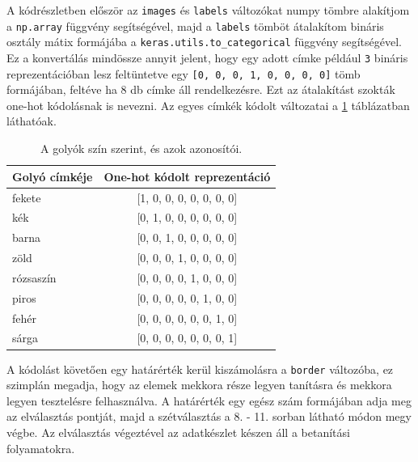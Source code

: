 \par A kódrészletben először az \lstinline{images} és \lstinline{labels} változókat numpy tömbre alakítjom a \lstinline{np.array} függvény segítségével, majd a \lstinline{labels} tömböt átalakítom bináris osztály mátix formájába a \lstinline{keras.utils.to_categorical} függvény\cite{tensorflow_docs} segítségével. Ez a konvertálás mindössze annyit jelent, hogy egy adott címke például \lstinline{3} bináris reprezentációban lesz feltüntetve egy \lstinline{[0, 0, 0, 1, 0, 0, 0, 0]} tömb formájában, feltéve ha 8 db címke áll rendelkezésre. Ezt az átalakítást szokták one-hot kódolásnak is nevezni\cite{harris2012digital}. Az egyes címkék kódolt változatai a \ref{tab:one_hot_labels} táblázatban láthatóak.

\begin{table}[!ht]
    \caption{A golyók szín szerint, és azok azonosítói.}
    \label{tab:one_hot_labels}
	\footnotesize
	\centering
	\begin{tabular}{ l c }
		\toprule
		Golyó címkéje & One-hot kódolt reprezentáció \\
		\midrule
		fekete      & [1, 0, 0, 0, 0, 0, 0, 0]\\
        kék         & [0, 1, 0, 0, 0, 0, 0, 0]\\
        barna       & [0, 0, 1, 0, 0, 0, 0, 0]\\
        zöld        & [0, 0, 0, 1, 0, 0, 0, 0]\\
        rózsaszín   & [0, 0, 0, 0, 1, 0, 0, 0]\\
        piros       & [0, 0, 0, 0, 0, 1, 0, 0]\\
        fehér       & [0, 0, 0, 0, 0, 0, 1, 0]\\
        sárga       & [0, 0, 0, 0, 0, 0, 0, 1]\\
		\bottomrule
	\end{tabular}
\end{table}

\par A kódolást követően egy határérték kerül kiszámolásra a \lstinline{border} változóba, ez szimplán megadja, hogy az elemek mekkora része legyen tanításra és mekkora legyen tesztelésre felhasználva. A határérték egy egész szám formájában adja meg az elválasztás pontját, majd a szétválasztás a 8. - 11. sorban látható módon megy végbe. Az elválasztás végeztével az adatkészlet készen áll a betanítási folyamatokra.

